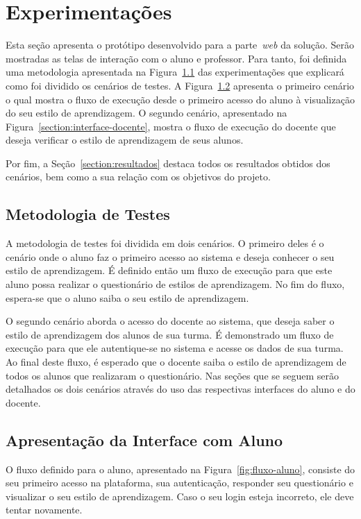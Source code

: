 \chapter{Experimentações}

Esta seção apresenta o protótipo desenvolvido para a parte~\emph{web} da solução. Serão mostradas as telas de interação com o aluno e professor. Para tanto, foi definida uma metodologia apresentada na Figura~\ref{section:metodologia-testes} das experimentações que explicará como foi dividido os cenários de testes.
A Figura~\ref{section:interface-aluno} apresenta o primeiro cenário o qual mostra o fluxo de execução desde o primeiro acesso do aluno à visualização do seu estilo de aprendizagem. O segundo cenário, apresentado na Figura~\ref{section:interface-docente}, mostra o fluxo de execução do docente que deseja verificar o estilo de aprendizagem de seus alunos.

Por fim, a Seção~\ref{section:resultados} destaca todos os resultados obtidos dos cenários, bem como a sua relação com os objetivos do projeto.

\section{Metodologia de Testes}\label{section:metodologia-testes}

A metodologia de testes foi dividida em dois cenários. O primeiro deles é o cenário onde o aluno faz o primeiro acesso ao sistema e deseja conhecer o seu estilo de aprendizagem. É definido então um fluxo de execução para que este aluno possa realizar o questionário de estilos de aprendizagem. No fim do fluxo, espera-se que o aluno saiba o seu estilo de aprendizagem.

O segundo cenário aborda o acesso do docente ao sistema, que deseja saber o estilo de aprendizagem dos alunos de sua turma. É demonstrado um fluxo de execução para que ele autentique-se no sistema e acesse os dados de sua turma. Ao final deste fluxo, é esperado que o docente saiba o estilo de aprendizagem de todos os alunos que realizaram o questionário. Nas seções que se seguem serão detalhados os dois cenários através do uso das respectivas interfaces do aluno e do docente.

\section{Apresentação da Interface com Aluno}\label{section:interface-aluno}
O fluxo definido para o aluno, apresentado na Figura~\ref{fig:fluxo-aluno}, consiste do seu primeiro acesso na plataforma, sua autenticação, responder seu questionário e visualizar o seu estilo de aprendizagem. Caso o seu login esteja incorreto, ele deve tentar novamente.


